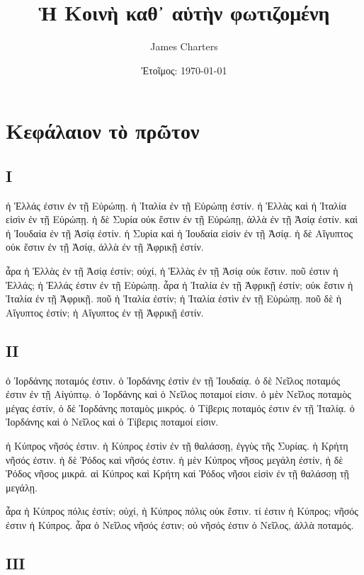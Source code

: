 \documentclass[a4paper]{report}
\title{Ἡ Κοινὴ καθ᾿ αὑτὴν φωτιζομένη}
\author{James Charters}
\date{Ἐτοῖμος: \today}
\begin{document}
\maketitle
\tableofcontents
\newpage
\section{Κεφάλαιον τὸ
πρῶτον}\label{ux3baux3b5ux3c6ux3acux3bbux3b1ux3b9ux3bfux3bd-ux3c4ux1f78-ux3c0ux3c1ux1ff6ux3c4ux3bfux3bd}

\subsection{Ι}\label{ux3b9}

ἡ Ἑλλάς ἐστιν ἐν τῇ Εὐρώπῃ. ἡ Ἰταλία ἐν τῇ Εὐρώπῃ ἐστίν. ἡ Ἑλλὰς καὶ ἡ
Ἰταλία εἰσὶν ἐν τῇ Εὐρώπῃ. ἡ δὲ Συρία οὐκ ἔστιν ἐν τῇ Εὐρώπῃ, ἀλλὰ ἐν τῇ
Ἀσίᾳ ἐστίν. καὶ ἡ Ἰουδαία ἐν τῇ Ἀσίᾳ ἐστίν. ἡ Συρία καὶ ἡ Ἰουδαία εἰσὶν
ἐν τῇ Ἀσίᾳ. ἡ δὲ Αἴγυπτος οὐκ ἔστιν ἐν τῇ Ἀσίᾳ, ἀλλὰ ἐν τῇ Ἀφρικῇ ἐστίν.

ἆρα ἡ Ἑλλὰς ἐν τῇ Ἀσίᾳ ἐστίν; οὐχί, ἡ Ἑλλὰς ἐν τῇ Ἀσίᾳ οὐκ ἔστιν. ποῦ
ἐστιν ἡ Ἑλλάς; ἡ Ἑλλάς ἐστιν ἐν τῇ Εὐρώπῃ. ἆρα ἡ Ἰταλία ἐν τῇ Ἀφρικῇ
ἐστίν; οὐκ ἔστιν ἡ Ἰταλία ἐν τῇ Ἀφρικῇ. ποῦ ἡ Ἰταλία ἐστίν; ἡ Ἰταλία
ἐστὶν ἐν τῇ Εὐρώπῃ. ποῦ δὲ ἡ Αἴγυπτος ἐστίν; ἡ Αἴγυπτος ἐν τῇ Ἀφρικῇ
ἐστίν.

\subsection{ΙΙ}\label{ux3b9ux3b9}

ὁ Ἰορδάνης {ποταμός} ἐστιν. ὁ Ἰορδάνης ἐστὶν ἐν τῇ Ἰουδαίᾳ. ὁ δὲ Νεῖλος
ποταμός ἐστιν ἐν τῇ Αἰγύπτῳ. ὁ Ἰορδάνης καὶ ὁ Νεῖλος ποταμοί εἰσιν. ὁ
μὲν Νεῖλος ποταμὸς μέγας ἐστίν, ὁ δὲ Ἰορδάνης ποταμὸς μικρός. ὁ Τίβερις
ποταμός ἐστιν ἐν τῇ Ἰταλίᾳ. ὁ Ἰορδάνης καὶ ὁ Νεῖλος καὶ ὁ Τίβερις
ποταμοί εἰσιν.

ἡ Κύπρος {νῆσός} ἐστιν. ἡ Κύπρος ἐστὶν ἐν τῇ θαλάσσῃ, ἐγγὺς τῆς Συρίας.
ἡ Κρήτη νῆσός ἐστιν. ἡ δὲ Ῥόδος καὶ νῆσός ἐστιν. ἡ μὲν Κύπρος νῆσος
μεγάλη ἐστίν, ἡ δὲ Ῥόδος νῆσος μικρά. αἱ Κύπρος καὶ Κρήτη καὶ Ῥόδος
νῆσοι εἰσὶν ἐν τῇ θαλάσσῃ τῇ μεγάλῃ.

ἆρα ἡ Κύπρος πόλις ἐστίν; οὐχί, ἡ Κύπρος πόλις οὐκ ἔστιν. τί ἐστιν ἡ
Κύπρος; νῆσός ἐστιν ἡ Κύπρος. ἆρα ὁ Νεῖλος νῆσός ἐστιν; οὐ νῆσός ἐστιν ὁ
Νεῖλος, ἀλλὰ ποταμός.

\subsection{ΙΙΙ}\label{ux3b9ux3b9ux3b9}
\end{document}
